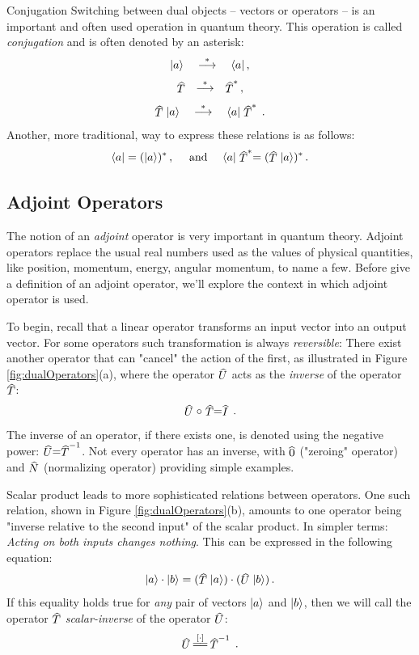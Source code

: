 \begin{mybio}{Conjugation}
	Switching between dual objects -- vectors or operators -- is an important and often used operation in quantum theory. This operation is called \emph{conjugation} and is often denoted by an asterisk:
	\[
	|{a}\rangle\quad\overset{*}{\longrightarrow}\quad\langle{a}|\,,
	\]
	\[
	\op{T}\quad\overset{*}{\longrightarrow}\quad\op{T}^*\,,
	\]
	\[
	\op{T}\ket{a}\quad\overset{*}{\longrightarrow}\quad\bra{a}\op{T}^*\,.
	\]
	Another, more traditional, way to express these relations is as follows:
	\[
	\bra{a} = (\ket{a})^*\,,\quad \textrm{ and }\quad \bra{a}\op{T}^*=(\op{T}\ket{a})^*\,.
	\]
\end{mybio}

\subsection{Adjoint Operators}
The notion of an \emph{adjoint} operator is very important in quantum theory. Adjoint operators replace the usual real numbers used as the values of physical quantities, like position, momentum, energy, angular momentum, to name a few.  Before give a definition of an adjoint operator, we'll explore the context in which adjoint operator is used.

To begin, recall that a linear operator transforms an input vector into an output vector. For some operators such transformation is always \emph{reversible}: There exist another operator that can "cancel" the action of the first, as illustrated in Figure \ref{fig:dualOperators}(a), where the operator $\op{U}$ acts as the \emph{inverse} of the operator $\op{T}$:
\[
\op{U}\circ\op{T}=\op{I}\,.
\]
The inverse of an operator, if there exists one, is denoted using the negative power: $\op{U}=\op{T}^{-1}$. Not every operator has an inverse, with $\op{0}$ ("zeroing" operator) and $\op{N}$ (normalizing operator) providing simple examples.

Scalar product leads to more sophisticated relations between operators. One such relation, shown in Figure \ref{fig:dualOperators}(b), amounts to one operator being "inverse relative to the second input" of the scalar product. In simpler terms: \emph{Acting on both inputs changes nothing}. This can be expressed in the following equation:
\[
\ket{a}\cdot\ket{b}=(\op{T}\ket{a})\cdot(\op{U}\ket{b})\,.
\]
If this equality holds true for \emph{any} pair of vectors $|{a}\rangle$ and $|{b}\rangle$, then we will call the operator $\op{T}$ \emph{scalar-inverse} of the operator $\op{U}$:
\[
\op{U}\,\overset{\lbrack \cdot \rbrack}{=\joinrel=}\,\op{T}^{-1}\,.
\]


